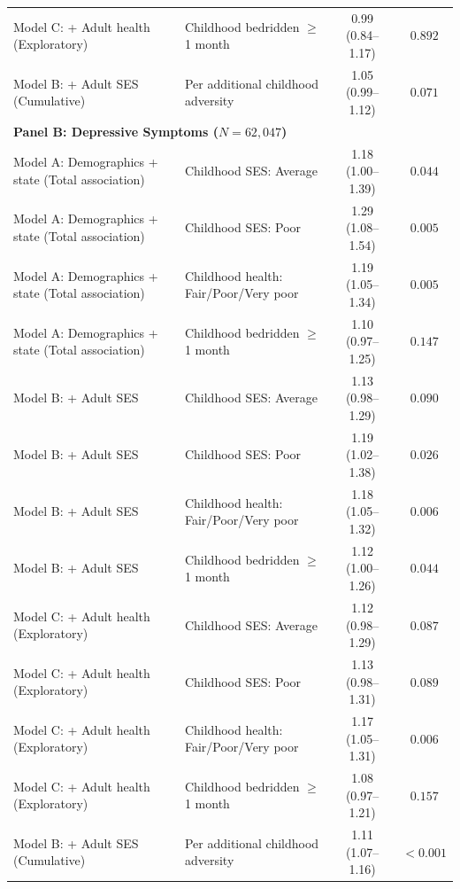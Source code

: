\documentclass[11pt,a4paper]{article}
\begin{document}
\begin{table}[H]
{\begin{tabular}{llcc}
Model C: + Adult health (Exploratory) & Childhood bedridden $\ge$1 month & 0.99 (0.84--1.17) & $0.892$ \\
Model B: + Adult SES (Cumulative) & Per additional childhood adversity & 1.05 (0.99--1.12) & $0.071$ \\
\midrule
\multicolumn{4}{l}{\textbf{Panel B: Depressive Symptoms ($N = 62,047$)}} \\
\midrule
Model A: Demographics + state (Total association) & Childhood SES: Average & 1.18 (1.00--1.39) & $0.044$ \\
Model A: Demographics + state (Total association) & Childhood SES: Poor & 1.29 (1.08--1.54) & $0.005$ \\
Model A: Demographics + state (Total association) & Childhood health: Fair/Poor/Very poor & 1.19 (1.05--1.34) & $0.005$ \\
Model A: Demographics + state (Total association) & Childhood bedridden $\ge$1 month & 1.10 (0.97--1.25) & $0.147$ \\
Model B: + Adult SES & Childhood SES: Average & 1.13 (0.98--1.29) & $0.090$ \\
Model B: + Adult SES & Childhood SES: Poor & 1.19 (1.02--1.38) & $0.026$ \\
Model B: + Adult SES & Childhood health: Fair/Poor/Very poor & 1.18 (1.05--1.32) & $0.006$ \\
Model B: + Adult SES & Childhood bedridden $\ge$1 month & 1.12 (1.00--1.26) & $0.044$ \\
Model C: + Adult health (Exploratory) & Childhood SES: Average & 1.12 (0.98--1.29) & $0.087$ \\
Model C: + Adult health (Exploratory) & Childhood SES: Poor & 1.13 (0.98--1.31) & $0.089$ \\
Model C: + Adult health (Exploratory) & Childhood health: Fair/Poor/Very poor & 1.17 (1.05--1.31) & $0.006$ \\
Model C: + Adult health (Exploratory) & Childhood bedridden $\ge$1 month & 1.08 (0.97--1.21) & $0.157$ \\
Model B: + Adult SES (Cumulative) & Per additional childhood adversity & 1.11 (1.07--1.16) & $<0.001$ \\
\bottomrule
\end{tabular}%
}
\end{table}
\end{document}
